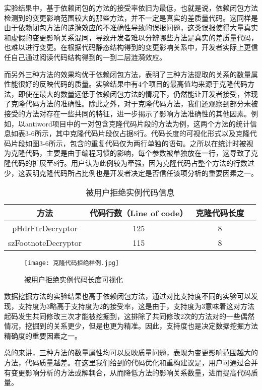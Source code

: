 实验结果中，基于依赖闭包的方法的接受率依旧为最低，也就是说，依赖闭包方法检测到的变更影响范围较大的那些方法，并不一定是真实的差质量代码。这同样是由于依赖闭包方法的涟漪效应的不准确性导致的误报问题，这类误报使得大量真实和虚假的变更影响关系混同，导致开发者难以分辨哪些方法是真实的差质量代码，也难以进行变更。在根据代码静态结构得到的变更影响关系中，开发者实际上更信任自己通过阅读代码结构得到的一到二层涟漪效应。

而另外三种方法的效果均优于依赖闭包方法，表明了三种方法提取的关系的数量属性能很好的反映代码的质量。实验结果中有4个项目的最高值均来源于克隆代码方法，即使在最大的数量远低于依赖闭包方法的情况下，仍然能让开发者接受，体现了克隆代码方法的准确性。除此之外，对于克隆代码方法，我们还观察到部分未被接受的方法对存在一些共同的特征，进一步揭示了影响方法准确性的其他因素。例如，以antiword项目中的一对包含克隆代码片段的方法为例，这两个方法的统计信息如表3-6所示，其中克隆代码片段仅占据8行。代码长度的可视化形式以及克隆代码片段如图3-6所示，包含的重复代码仅为两行单独的语句。之所以在统计时被视为克隆代码，主要是由于编程习惯的影响，每个参数被单独放在一行，这导致了克隆代码的扩展至8行。用户认为此例较为牵强，因为克隆代码占整个方法的行数过少，这表明克隆代码所占比例也是开发者决定是否信任该项分析的重要因素之一。

\begin{table}[htbp]
\caption{被用户拒绝实例代码信息}
\vspace{0.5em}\centering\wuhao
\begin{tabular}{cccc}
\toprule
方法 & 代码行数（Line of code）  & 克隆代码长度\\
\midrule
pHdrFtrDecryptor & 125 & 8 \\
szFootnoteDecryptor  & 115 & 8 \\
\bottomrule
\end{tabular}
\end{table}

\begin{figure}[h]
\centering
\texttt{[image: 克隆代码拒绝样例.jpg]}
\caption{被用户拒绝实例代码长度可视化}
\end{figure}

数据挖掘方法的实验结果也高于依赖闭包方法，通过对比支持度不同的实验可以发现，支持度为3略高于支持度为2的接受率，这是由于，支持度为3意味着这对方法起码发生共同修改三次才能被挖掘到，这排除了共同修改2次的方法对的一些偶然情况，挖掘到的关系更少，但是也更为精准。因此，支持度也是决定数据挖掘方法精确度的重要因素之一。

总的来讲，三种方法的数量属性均可以反映质量问题，表现为变更影响范围越大的方法，代码质量越差。在这里我们给到的代码优化和重构建议是，用户可通过合并有变更影响分析的方法或解耦合，从而降低方法的影响关系数量，进而提高代码质量。


